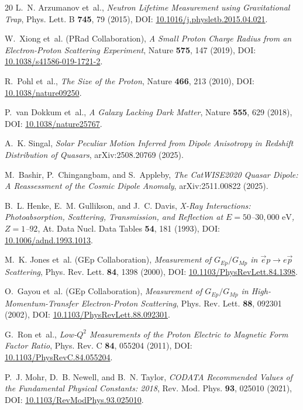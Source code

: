 \documentclass[11pt,a4paper]{article}
\begin{document}
\begin{thebibliography}{20}
		L.~N. Arzumanov et~al., \emph{Neutron Lifetime Measurement using Gravitational Trap}, Phys. Lett. B \textbf{745}, 79 (2015), DOI: \href{https://doi.org/10.1016/j.physletb.2015.04.021}{10.1016/j.physletb.2015.04.021}.
		
		W.~Xiong et~al. (PRad Collaboration), \emph{A Small Proton Charge Radius from an Electron-Proton Scattering Experiment}, Nature \textbf{575}, 147 (2019), DOI: \href{https://doi.org/10.1038/s41586-019-1721-2}{10.1038/s41586-019-1721-2}.
		
		R.~Pohl et~al., \emph{The Size of the Proton}, Nature \textbf{466}, 213 (2010), DOI: \href{https://doi.org/10.1038/nature09250}{10.1038/nature09250}.
		
		P.~van Dokkum et~al., \emph{A Galaxy Lacking Dark Matter}, Nature \textbf{555}, 629 (2018), DOI: \href{https://doi.org/10.1038/nature25767}{10.1038/nature25767}.
		
		A.~K. Singal, \emph{Solar Peculiar Motion Inferred from Dipole Anisotropy in Redshift Distribution of Quasars}, arXiv:2508.20769 (2025).
		
		M.~Bashir, P.~Chingangbam, and S.~Appleby, \emph{The CatWISE2020 Quasar Dipole: A Reassessment of the Cosmic Dipole Anomaly}, arXiv:2511.00822 (2025).
		
		B.~L. Henke, E.~M. Gullikson, and J.~C. Davis, \emph{X-Ray Interactions: Photoabsorption, Scattering, Transmission, and Reflection at $E = 50$--$30,000\text{ eV}$, $Z = 1$--$92$}, At. Data Nucl. Data Tables \textbf{54}, 181 (1993), DOI: \href{https://doi.org/10.1006/adnd.1993.1013}{10.1006/adnd.1993.1013}.
		
		M.~K. Jones et~al. (GEp Collaboration), \emph{Measurement of $G_{Ep}/G_{Mp}$ in $\vec{e}p \to e\vec{p}$ Scattering}, Phys. Rev. Lett. \textbf{84}, 1398 (2000), DOI: \href{https://doi.org/10.1103/PhysRevLett.84.1398}{10.1103/PhysRevLett.84.1398}.
		
		O.~Gayou et~al. (GEp Collaboration), \emph{Measurement of $G_{Ep}/G_{Mp}$ in High-Momentum-Transfer Electron-Proton Scattering}, Phys. Rev. Lett. \textbf{88}, 092301 (2002), DOI: \href{https://doi.org/10.1103/PhysRevLett.88.092301}{10.1103/PhysRevLett.88.092301}.
		
		G.~Ron et~al., \emph{Low-$Q^2$ Measurements of the Proton Electric to Magnetic Form Factor Ratio}, Phys. Rev. C \textbf{84}, 055204 (2011), DOI: \href{https://doi.org/10.1103/PhysRevC.84.055204}{10.1103/PhysRevC.84.055204}.
		
		P.~J. Mohr, D.~B. Newell, and B.~N. Taylor, \emph{CODATA Recommended Values of the Fundamental Physical Constants: 2018}, Rev. Mod. Phys. \textbf{93}, 025010 (2021), DOI: \href{https://doi.org/10.1103/RevModPhys.93.025010}{10.1103/RevModPhys.93.025010}.
		
	\end{thebibliography}
	
\end{document}
